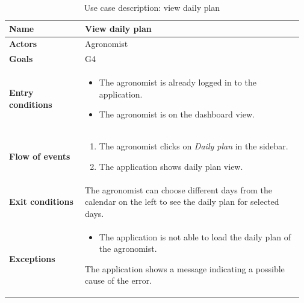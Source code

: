 \begin{table}[H]
    \centering
	\begin{tabular}{@{}p{0.25\linewidth} p{0.72\linewidth}@{}}
        \toprule
		\textbf{Name}               & View daily plan\\
		\midrule
		\textbf{Actors}             & Agronomist\\
		\midrule
		\textbf{Goals}              & G4 \\
		\midrule
		
		\textbf{Entry conditions}   & \begin{itemize}[leftmargin=.4cm,noitemsep,topsep=0pt,before=\vspace{-3mm},after=\vspace{-4mm}]
		    \item The agronomist is already logged in to the application.
		    \item The agronomist is on the dashboard view.
		\end{itemize}\\
		\midrule
		
		\textbf{Flow of events}     & \begin{enumerate}[leftmargin=.4cm,noitemsep,topsep=0pt,before=\vspace{-3mm},after=\vspace{-4mm}]
		    \item The agronomist clicks on \textit{Daily plan} in the sidebar.
		    \item The application shows daily plan view.
		\end{enumerate}\\
		\midrule
		\textbf{Exit conditions}    & The agronomist can choose different days from the calendar on the left to see the daily plan for selected days. \\
		\midrule
		
		\textbf{Exceptions}         & 
	    \begin{itemize}[leftmargin=.4cm,noitemsep,topsep=0pt,before=\vspace{-3mm}]
		   \item The application is not able to load the daily plan of the agronomist.
		\end{itemize}
		The application shows a message indicating a possible cause of the error.
		\\\bottomrule
	\end{tabular}
	\caption{Use case description: view daily plan} 
\end{table}


